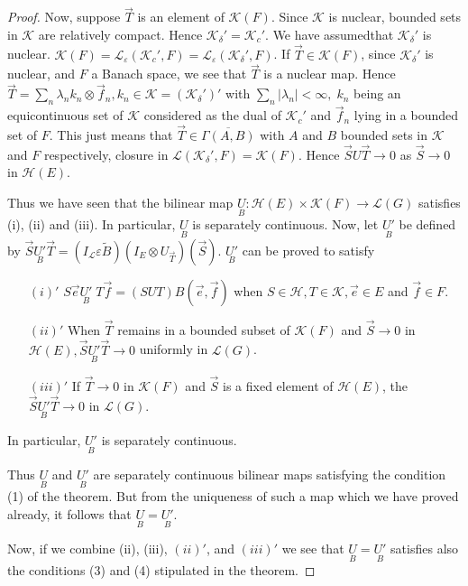 \begin{proof}
Now, suppose $\overrightarrow{T}$ is an element of
$\mathscr{K}(F)$. Since $\mathscr{K}$ is nuclear, bounded sets in
$\mathscr{K}$ are relatively  compact. Hence $\mathscr{K}_\delta' =
\mathscr{K}_c'$. We have assumed\pageoriginale that $\mathscr{K}_\delta'$ is
nuclear. $\mathscr{K}(F) = \mathscr{L}_\varepsilon(\mathscr{K}_c', F)
= \mathscr{L}_\varepsilon(\mathscr{K}_\delta', F)$. If
$\overrightarrow{T} \in \mathscr{K}(F)$, since $\mathscr{K}_\delta'$
is nuclear, and $F$ a Banach space, we see that $\overrightarrow{T}$
is a nuclear map. Hence $\overrightarrow{T} =
\sum\limits_n\lambda_nk_n \otimes \overrightarrow{f}_n, k_n \in
\mathscr{K} = (\mathscr{K}_\delta')'$ with $\sum\limits_n |\lambda_n
|< \infty, \; k_n$ being an equicontinuous set of $\mathscr{K}$
considered as the dual of $\mathscr{K}_c'$ and $\overrightarrow{f}_n$
lying in a bounded set of $F$. This just means that
$\overrightarrow{T} \in \overline{\Gamma(A, B)}$ with $A$ and $B$
bounded sets in $\mathscr{K}$ and $F$ respectively, closure in
$\mathscr{L}(\mathscr{K}_\delta', F) = \mathscr{K}(F)$. Hence
$\overrightarrow{S} U \overrightarrow{T} \to 0$ as $\overrightarrow{S}
\to 0$ in $\mathscr{H}(E)$. 

Thus we have seen that the bilinear map
$\underset{B}{U}:\mathscr{H}(E)\times \mathscr{K}(F) \to \mathscr{L}(G)$
satisfies (i), (ii) and (iii). In particular, $\underset{B}{U}$ is
separately continuous. Now, let $\underset{B}{U'}$ be defined by
$\overrightarrow{S} \underset{B}{U'} \overrightarrow{T} =
(I_{\mathscr{L}} \varepsilon \tilde{B}) (I_E \otimes
U_{\overrightarrow{T}}) (\overrightarrow{S})$. $\underset{B}{U'}$ can
be proved to satisfy 
\begin{itemize}
\item [$(i)'$] $S \overrightarrow{e} \underset{B}{U'} \; T
  \overrightarrow{f} = (S U T) B (\overrightarrow{e},
  \overrightarrow{f})$ when $S \in \mathscr{H}, T \in \mathscr{K},
  \overrightarrow{e} \in E$ and $\overrightarrow{f} \in F$. 
\item [$(ii)'$] When $\overrightarrow{T}$ remains in a bounded subset
  of $\mathscr{K}(F)$ and $\overrightarrow{S} \to 0$ in
  $\mathscr{H}(E), \overrightarrow{S} \underset{B}{U'}
  \overrightarrow{T} \to 0$ uniformly in $\mathscr{L}(G)$.
\item [$(iii)'$] If $\overrightarrow{T} \to 0$ in $\mathscr{K}(F)$ and
  $\overrightarrow{S}$ is a fixed element of $\mathscr{H}(E)$, the
  $\overrightarrow{S} \underset{B}{U'} \overrightarrow{T} \to 0$ in
  $\mathscr{L}(G)$.
\end{itemize}

In particular, $\underset{B}{U'}$ is separately continuous.   

\noindent Thus $\underset{B}{U}$ and $\underset{B}{U'}$ are separately
continuous bilinear maps satisfying the condition (1) of the
theorem. But from the uniqueness of such a map which we have proved
already, it follows that $\underset{B}{U} = \underset{B}{U'}$. 

Now, if we combine (ii), (iii), $(ii)'$, and $(iii)'$ we see that
$\underset{B}{U} = \underset{B}{U'}$ satisfies also the conditions (3)
and (4) stipulated in the theorem.
\end{proof}

